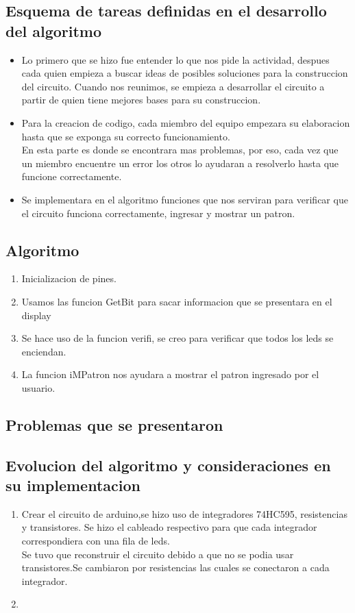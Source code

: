\documentclass{article}
\begin{document}
\subsection{Esquema de tareas definidas en el desarrollo del algoritmo}
\begin{itemize}
    \item Lo primero que se hizo fue entender lo que nos pide la actividad, despues cada quien empieza a buscar ideas de posibles soluciones para la construccion del circuito. Cuando nos reunimos, se empieza a desarrollar el circuito a partir de quien tiene mejores bases para su construccion.
    \item Para la creacion de codigo, cada miembro del equipo empezara su elaboracion hasta que se exponga su correcto funcionamiento.\\ 
    En esta parte es donde se encontrara mas problemas, por eso, cada vez que un miembro encuentre un error los otros lo ayudaran a resolverlo hasta que funcione correctamente.
    \item Se implementara en el algoritmo funciones que nos serviran para verificar que el circuito funciona correctamente, ingresar y mostrar un patron.
\end{itemize}
\subsection{Algoritmo}
\begin{enumerate}
    \item Inicializacion de pines.
    \item Usamos las funcion GetBit para sacar informacion que se presentara en el display
    \item Se hace uso de la funcion verifi, se creo para verificar que todos los leds se enciendan.
    \item La funcion iMPatron nos ayudara a mostrar el patron ingresado por el usuario.
\end{enumerate}
\subsection{Problemas que se presentaron}
\subsection{Evolucion del algoritmo y consideraciones en su implementacion}
\begin{enumerate}
    \item Crear el circuito de arduino,se hizo uso de integradores 74HC595, resistencias y transistores. Se hizo el cableado respectivo para que cada integrador correspondiera con una fila de leds.\\
    Se tuvo que reconstruir el circuito debido a que no se podia usar transistores.Se cambiaron por resistencias las cuales se conectaron a cada integrador.
    \item
\end{enumerate}
\end{document}
